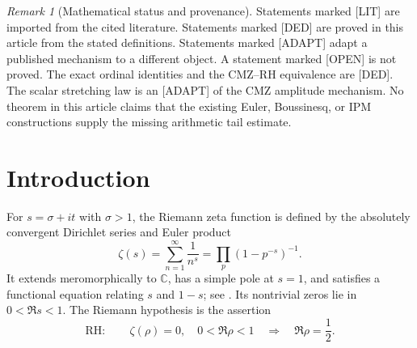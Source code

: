 \documentclass[11pt]{amsart}
\numberwithin{equation}{section}
\theoremstyle{plain}
\theoremstyle{definition}
\theoremstyle{remark}
\newtheorem{remark}[theorem]{Remark}
\newcommand{\C}{\mathbb C}
\newcommand{\RH}{\mathrm{RH}}
\begin{document}
\maketitle

\tableofcontents

\bigskip

\begin{remark}[Mathematical status and provenance]
\label{rem:status}
Statements marked \textup{[LIT]} are imported from the cited literature.
Statements marked \textup{[DED]} are proved in this article from the stated
definitions.  Statements marked \textup{[ADAPT]} adapt a published mechanism
to a different object.  A statement marked \textup{[OPEN]} is not proved.
The exact ordinal identities and the CMZ--RH equivalence are \textup{[DED]}.
The scalar stretching law is an \textup{[ADAPT]} of the CMZ amplitude
mechanism.  No theorem in this article claims that the existing Euler,
Boussinesq, or IPM constructions supply the missing arithmetic tail estimate.
\end{remark}

\section{Introduction}
\label{sec:introduction}

For $s=\sigma+it$ with $\sigma>1$, the Riemann zeta function is defined by
the absolutely convergent Dirichlet series and Euler product
\begin{equation}
\zeta(s)=\sum_{n=1}^{\infty}\frac1{n^s}
=\prod_p\left(1-p^{-s}\right)^{-1}.
\label{eq:zeta-series-product}
\end{equation}
It extends meromorphically to $\C$, has a simple pole at $s=1$, and satisfies
a functional equation relating $s$ and $1-s$; see
\cite{Titchmarsh1986,Apostol1976}.  Its nontrivial zeros lie in
$0<\Re s<1$.  The Riemann hypothesis is the assertion
\begin{equation}
\RH:\qquad \zeta(\rho)=0,\quad 0<\Re\rho<1
\quad\Longrightarrow\quad \Re\rho=\frac12.
\label{eq:RH-statement}
\end{equation}
\end{document}
